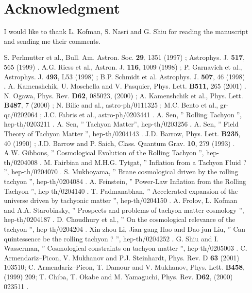 \documentclass[a4paper,12pt,a4]{article}
\begin{document}
\section*{Acknowledgment }
I would like to thank L. Kofman, S. Nasri and G. Shiu for
 reading the manuscript and 
sending me their comments. 
\begin{thebibliography}{99}  
S. Perlmutter et al., Bull. Am. Astron. Soc. {\bf 29}, 1351 (1997) ; 
Astrophys. J. {\bf517}, 565 (1999) .
A.G. Riess et al., Astron. J. {\bf 116}, 1009 (1998) ; 
P. Garnavich et al., Astrophys. J. {\bf 493}, L53 (1998) ; 
B.P. Schmidt et al. Astrophys. J. {\bf 507}, 46 (1998) . 
A. Kamenshchik, U. Moschella and V. Pasquier, Phys. Lett. {\bf B511}, 265 
(2001) . 
N. Ogawa, Phys. Rev. {\bf D62}, 085023, (2000) ; A. Kamenshchik et al., 
Phys. Lett. {\bf B487}, 7 (2000) ; N. Bilic and al., astro-ph/0111325 ; 
M.C. Bento et al., gr-qc/0202064 ; J.C. Fabris et al., astro-ph/0203441 .
A. Sen, '' Rolling Tachyon '', hep-th/0203211 . 
A. Sen, '' Tachyon Matter'', hep-th/0203256 .   
A. Sen, '' Field Theory of Tachyon Matter '', hep-th/0204143 .
J.D. Barrow, Phys. Lett. {\bf B235}, 40 (1990) ; 
J.D. Barrow and P. Saich, Class. Quantum Grav. {\bf 10}, 279 (1993) .
A.W. Gibbons, '' Cosmological Evolution of the Rolling Tachyon '', 
hep-th/0204008 . 
M. Fairbian and M.H.G. Tytgat, '' Inflation from a Tachyon Fluid ? '', 
hep-th/0204070 .   
S. Mukhoyama, '' Brane cosmological driven by the rolling tachyon '', 
hep-th/0204084 .
A. Feinstein, '' Power-Law Inflation from the Rolling Tachyon '', 
hep-th/0204140 .
T. Padmanabhan, '' Accelerated expansion of the universe driven by 
tachyonic matter '', hep-th/0204150 . 
A. Frolov, L. Kofman and A.A. Starobinsky, '' Prospects and problems 
of tachyon matter cosmology '', hep-th/0204187 . 
D. Choudhury et al., '' On the cosmological relevance of the tachyon '', 
hep-th/0204204 . 
Xin-zhou Li, Jian-gang Hao and Dao-jun Liu, '' Can quintessence be the 
rolling tachyon ? '', hep-th/0204252 . 
G. Shiu and I. Wasserman, '' Cosmological constraints on tachyon matter '', 
hep-th/0205003 . 
C. Armendariz--Picon, V. Mukhanov and P.J. Steinhardt, Phys. Rev. D {\bf 63} 
(2001) 103510; C. Armendariz--Picon, T. Damour and V. Mukhanov, Phys. Lett. 
{\bf B458}, (1999) 209; T. Chiba, T. Okabe and M. Yamaguchi, Phys. Rev. 
{\bf D62}, (2000) 023511 . 
\end{thebibliography}
\end{document}
